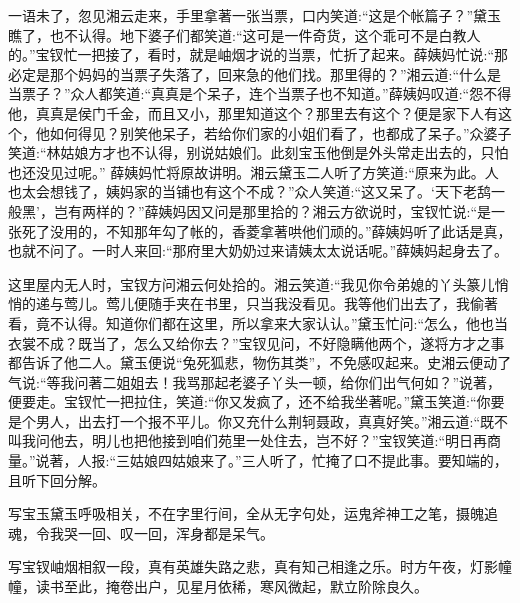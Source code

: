 \begin{parag}
    一语未了，忽见湘云走来，手里拿著一张当票，口内笑道:“这是个帐篇子？”黛玉瞧了，也不认得。地下婆子们都笑道:“这可是一件奇货，这个乖可不是白教人的。”宝钗忙一把接了，看时，就是岫烟才说的当票，忙折了起来。薛姨妈忙说:“那必定是那个妈妈的当票子失落了，回来急的他们找。那里得的？”湘云道:“什么是当票子？”众人都笑道:“真真是个呆子，连个当票子也不知道。”薛姨妈叹道:“怨不得他，真真是侯门千金，而且又小，那里知道这个？那里去有这个？便是家下人有这个，他如何得见？别笑他呆子，若给你们家的小姐们看了，也都成了呆子。”众婆子笑道:“林姑娘方才也不认得，别说姑娘们。此刻宝玉他倒是外头常走出去的，只怕也还没见过呢。” 薛姨妈忙将原故讲明。湘云黛玉二人听了方笑道:“原来为此。人也太会想钱了，姨妈家的当铺也有这个不成？”众人笑道:“这又呆了。‘天下老鸹一般黑’，岂有两样的？”薛姨妈因又问是那里拾的？湘云方欲说时，宝钗忙说:“是一张死了没用的，不知那年勾了帐的，香菱拿著哄他们顽的。”薛姨妈听了此话是真，也就不问了。一时人来回:“那府里大奶奶过来请姨太太说话呢。”薛姨妈起身去了。
\end{parag}


\begin{parag}
    这里屋内无人时，宝钗方问湘云何处拾的。湘云笑道:“我见你令弟媳的丫头篆儿悄悄的递与莺儿。莺儿便随手夹在书里，只当我没看见。我等他们出去了，我偷著看，竟不认得。知道你们都在这里，所以拿来大家认认。”黛玉忙问:“怎么，他也当衣裳不成？既当了，怎么又给你去？”宝钗见问，不好隐瞒他两个，遂将方才之事都告诉了他二人。黛玉便说“兔死狐悲，物伤其类”，不免感叹起来。史湘云便动了气说:“等我问著二姐姐去！我骂那起老婆子丫头一顿，给你们出气何如？”说著，便要走。宝钗忙一把拉住，笑道:“你又发疯了，还不给我坐著呢。”黛玉笑道:“你要是个男人，出去打一个报不平儿。你又充什么荆轲聂政，真真好笑。”湘云道:“既不叫我问他去，明儿也把他接到咱们苑里一处住去，岂不好？”宝钗笑道:“明日再商量。”说著，人报:“三姑娘四姑娘来了。”三人听了，忙掩了口不提此事。要知端的，且听下回分解。
\end{parag}


\begin{parag}
    \begin{note}写宝玉黛玉呼吸相关，不在字里行间，全从无字句处，运鬼斧神工之笔，摄魄追魂，令我哭一回、叹一回，浑身都是呆气。\end{note}
\end{parag}


\begin{parag}
    \begin{note}写宝钗岫烟相叙一段，真有英雄失路之悲，真有知己相逢之乐。时方午夜，灯影幢幢，读书至此，掩卷出户，见星月依稀，寒风微起，默立阶除良久。\end{note}
\end{parag}
